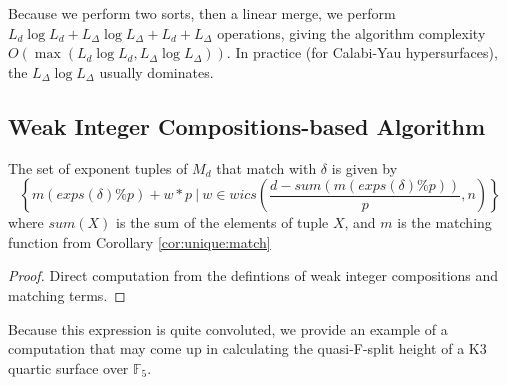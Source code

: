 Because we perform two sorts, then a linear merge, 
we perform 
$L_{d} \log L_{d} + L_{\Delta} \log L_{\Delta} + L_{d} + L_{\Delta}$ operations, 
giving the algorithm complexity 
$O(\max(L_{d} \log L_{d}, L_{\Delta} \log L_{\Delta}))$.
In practice (for Calabi-Yau hypersurfaces), 
the $L_{\Delta} \log L_{\Delta}$ usually dominates.

\subsection{Weak Integer Compositions-based Algorithm}

\begin{lem}
    \label{lem:generate:matching}
    The set of exponent tuples of \(M_{d}\) that match with $\delta$ is given by 
    \[
        \left\{ m(exps(\delta) \% p) + w *p ~\Big|~ w \in wics \left(\frac{d - sum(m(exps(\delta) \% p))}{p}, n \right) \right\}
    \]
    where $sum(X)$ is the sum of the elements of tuple $X$, and $m$ is the matching function from Corollary \ref{cor:unique:match}
\end{lem}

\begin{proof}
    Direct computation from the defintions of weak integer compositions and matching terms.
\end{proof}


Because this expression is quite convoluted, we 
provide an example of a computation 
that may come up in calculating the quasi-F-split 
height of a K3 quartic surface over $\mathbb{F}_5$.

